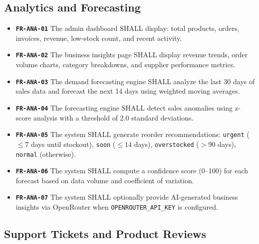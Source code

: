 ﻿\documentclass[12pt,a4paper]{report}
\newcommand{\req}[1]{\texttt{\textbf{\color{primary}#1}}}
\begin{document}
\subsection{Analytics and Forecasting}

\begin{tcolorbox}[reqbox,title={FR-ANALYTICS: Analytics Requirements}]
\begin{itemize}[leftmargin=1.5em]
  \item \req{FR-ANA-01} The admin dashboard SHALL display: total products, orders, invoices, revenue, low-stock count, and recent activity.
  \item \req{FR-ANA-02} The business insights page SHALL display revenue trends, order volume charts, category breakdowns, and supplier performance metrics.
  \item \req{FR-ANA-03} The demand forecasting engine SHALL analyze the last 30 days of sales data and forecast the next 14 days using weighted moving averages.
  \item \req{FR-ANA-04} The forecasting engine SHALL detect sales anomalies using z-score analysis with a threshold of 2.0 standard deviations.
  \item \req{FR-ANA-05} The system SHALL generate reorder recommendations: \texttt{urgent} ($\leq 7$ days until stockout), \texttt{soon} ($\leq 14$ days), \texttt{overstocked} ($> 90$ days), \texttt{normal} (otherwise).
  \item \req{FR-ANA-06} The system SHALL compute a confidence score (0--100) for each forecast based on data volume and coefficient of variation.
  \item \req{FR-ANA-07} The system SHALL optionally provide AI-generated business insights via OpenRouter when \texttt{OPENROUTER\_API\_KEY} is configured.
\end{itemize}
\end{tcolorbox}

\subsection{Support Tickets and Product Reviews}
\end{document}
